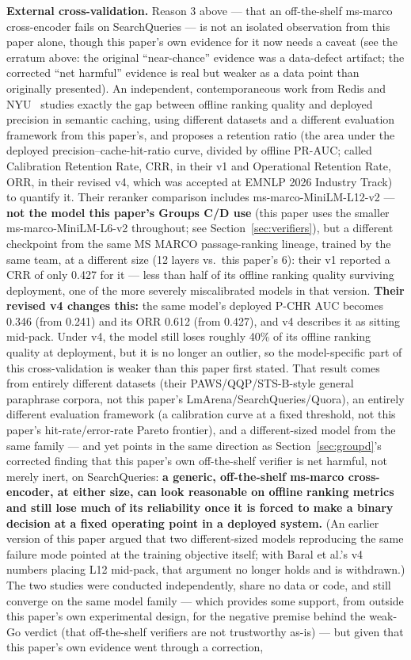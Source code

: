 \documentclass[11pt]{article}
\begin{document}
\textbf{External cross-validation.} Reason 3 above --- that an off-the-shelf ms-marco cross-encoder fails on SearchQueries --- is not an isolated observation from this paper alone, though this paper's own evidence for it now needs a caveat (see the erratum above: the original ``near-chance'' evidence was a data-defect artifact; the corrected ``net harmful'' evidence is real but weaker as a data point than originally presented). An independent, contemporaneous work from Redis and NYU~\cite{calibrationgap} studies exactly the gap between offline ranking quality and deployed precision in semantic caching, using different datasets and a different evaluation framework from this paper's, and proposes a retention ratio (the area under the deployed precision--cache-hit-ratio curve, divided by offline PR-AUC; called Calibration Retention Rate, CRR, in their v1 and Operational Retention Rate, ORR, in their revised v4, which was accepted at EMNLP 2026 Industry Track) to quantify it. Their reranker comparison includes ms-marco-MiniLM-L12-v2 --- \textbf{not the model this paper's Groups C/D use} (this paper uses the smaller ms-marco-MiniLM-L6-v2 throughout; see Section~\ref{sec:verifiers}), but a different checkpoint from the same MS MARCO passage-ranking lineage, trained by the same team, at a different size (12 layers vs.\ this paper's 6): their v1 reported a CRR of only 0.427 for it --- less than half of its offline ranking quality surviving deployment, one of the more severely miscalibrated models in that version. \textbf{Their revised v4 changes this:} the same model's deployed P-CHR AUC becomes 0.346 (from 0.241) and its ORR 0.612 (from 0.427), and v4 describes it as sitting mid-pack. Under v4, the model still loses roughly 40\% of its offline ranking quality at deployment, but it is no longer an outlier, so the model-specific part of this cross-validation is weaker than this paper first stated. That result comes from entirely different datasets (their PAWS/QQP/STS-B-style general paraphrase corpora, not this paper's LmArena/SearchQueries/Quora), an entirely different evaluation framework (a calibration curve at a fixed threshold, not this paper's hit-rate/error-rate Pareto frontier), and a different-sized model from the same family --- and yet points in the same direction as Section~\ref{sec:groupd}'s corrected finding that this paper's own off-the-shelf verifier is net harmful, not merely inert, on SearchQueries: \textbf{a generic, off-the-shelf ms-marco cross-encoder, at either size, can look reasonable on offline ranking metrics and still lose much of its reliability once it is forced to make a binary decision at a fixed operating point in a deployed system.} (An earlier version of this paper argued that two different-sized models reproducing the same failure mode pointed at the training objective itself; with Baral et al.'s v4 numbers placing L12 mid-pack, that argument no longer holds and is withdrawn.) The two studies were conducted independently, share no data or code, and still converge on the same model family --- which provides some support, from outside this paper's own experimental design, for the negative premise behind the weak-Go verdict (that off-the-shelf verifiers are not trustworthy as-is) --- but given that this paper's own evidence went through a correction, 
\end{document}
